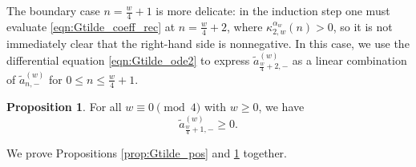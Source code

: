 \documentclass[10pt,reqno]{amsproc}
\newcommand{\1}{\mathds{1}}	%
\theoremstyle{definition}
\newtheorem{proposition}[theorem]{Proposition}
\theoremstyle{remark}
\begin{document}
The boundary case $n = \frac{w}{4} + 1$ is more delicate: in the induction step one must evaluate \eqref{eqn:Gtilde_coeff_rec} at $n = \frac{w}{4} + 2$, where $\kappa_{2,w}^{\alpha_w}(n) > 0$, so it is not immediately clear that the right-hand side is nonnegative.
In this case, we use the differential equation \eqref{eqn:Gtilde_ode2} to express $\tilde{a}_{\frac{w}{4}+2,-}^{(w)}$ as a linear combination of $\tilde{a}_{n,-}^{(w)}$ for $0 \le n \le \frac{w}{4}+1$.
\begin{proposition}
    \label{prop:Gtilde_pos_boundary}
    For all $w \equiv 0 \pmod{4}$ with $w \ge 0$, we have
    \begin{equation}
        \tilde{a}_{\frac{w}{4}+1,-}^{(w)} \ge 0.
    \end{equation}
\end{proposition}
We prove Propositions \ref{prop:Gtilde_pos} and \ref{prop:Gtilde_pos_boundary} together.
\end{document}
